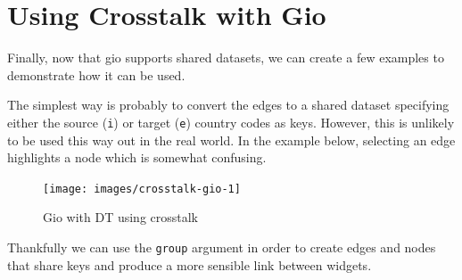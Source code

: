 \documentclass[10pt,]{krantz}
\makeatletter
\newenvironment{Shaded}{\begin{snugshade}}{\end{snugshade}}
\newcommand{\CommentTok}[1]{\textcolor[rgb]{0.37,0.37,0.37}{\textit{#1}}}
\newcommand{\DataTypeTok}[1]{\textcolor[rgb]{0.27,0.27,0.27}{#1}}
\newcommand{\KeywordTok}[1]{\textcolor[rgb]{0.27,0.27,0.27}{\textbf{#1}}}
\newcommand{\NormalTok}[1]{#1}
\newcommand{\OperatorTok}[1]{\textcolor[rgb]{0.43,0.43,0.43}{\textbf{#1}}}
\newcommand{\StringTok}[1]{\textcolor[rgb]{0.5,0.5,0.5}{#1}}
\newenvironment{kframe}{%
\medskip{}
\setlength{\fboxsep}{.8em}
 \def\at@end@of@kframe{}%
 \ifinner\ifhmode%
  \def\at@end@of@kframe{\end{minipage}}%
  \begin{minipage}{\columnwidth}%
 \fi\fi%
 \def\FrameCommand##1{\hskip\@totalleftmargin \hskip-\fboxsep
 \colorbox{shadecolor}{##1}\hskip-\fboxsep
     \hskip-\linewidth \hskip-\@totalleftmargin \hskip\columnwidth}%
 \MakeFramed {\advance\hsize-\width
   \@totalleftmargin\z@ \linewidth\hsize
   \@setminipage}}%
 {\par\unskip\endMakeFramed%
 \at@end@of@kframe}
\renewenvironment{Shaded}{\begin{kframe}}{\end{kframe}}
\makeatother
\begin{document}
\hypertarget{linking-widgets-using}{%
\section{Using Crosstalk with Gio}\label{linking-widgets-using}}

Finally, now that gio supports shared datasets, we can create a few examples to demonstrate how it can be used.

The simplest way is probably to convert the edges to a shared dataset specifying either the source (\texttt{i}) or target (\texttt{e}) country codes as keys. However, this is unlikely to be used this way out in the real world. In the example below, selecting an edge highlights a node which is somewhat confusing.

\begin{Shaded}
\end{Shaded}

\begin{figure}[H]

{\centering \texttt{[image: images/crosstalk-gio-1]} 

}

\caption{Gio with DT using crosstalk}\label{fig:crosstalk-gio-1}
\end{figure}

Thankfully we can use the \texttt{group} argument in order to create edges and nodes that share keys and produce a more sensible link between widgets.
\end{document}
